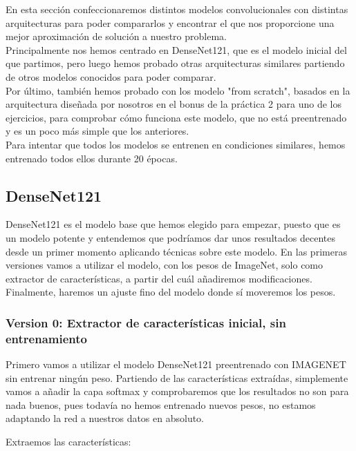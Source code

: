 \documentclass[11pt,a4paper]{article}
\theoremstyle{definition}
\begin{document}
En esta sección confeccionaremos distintos modelos convolucionales con distintas arquitecturas para poder compararlos y encontrar el que nos proporcione una mejor aproximación de solución a nuestro problema.\\

Principalmente nos hemos centrado en DenseNet121, que es el modelo inicial del que partimos, pero luego hemos probado otras arquitecturas similares partiendo de otros modelos conocidos para poder comparar.\\

Por último, también hemos probado con los modelo "from scratch", basados en la arquitectura diseñada por nosotros en el bonus de la práctica 2 para uno de los ejercicios, para comprobar cómo funciona este modelo, que no está preentrenado y es un poco más simple que los anteriores.\\

Para intentar que todos los modelos se entrenen en condiciones similares, hemos entrenado todos ellos durante 20 épocas.

\subsection{DenseNet121}

DenseNet121 es el modelo base que hemos elegido para empezar, puesto que es un modelo potente y entendemos que podríamos dar unos resultados decentes desde un primer momento aplicando técnicas sobre este modelo. En las primeras versiones vamos a utilizar el modelo, con los pesos de ImageNet, solo como extractor de características, a partir del cuál añadiremos modificaciones. Finalmente, haremos un ajuste fino del modelo donde sí moveremos los pesos.

\subsubsection{Version 0: Extractor de características inicial, sin entrenamiento}

Primero vamos a utilizar el modelo DenseNet121 preentrenado con IMAGENET sin entrenar ningún peso. Partiendo de las características extraídas, simplemente vamos a añadir la capa softmax y comprobaremos que los resultados no son para nada buenos, pues todavía no hemos entrenado nuevos pesos, no estamos adaptando la red a nuestros datos en absoluto.

Extraemos las características:
\end{document}

